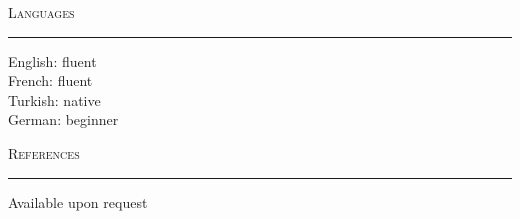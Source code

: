 \documentclass[10pt]{article}
\newcommand{\mysec}[1]{\vspace{2em}\textsc{\large #1}\vspace{1mm}\hrule\vspace{2mm}}
\newcommand{\mysub}[3]{\textbf{#1} {#2} \hfill {\em #3}}
\newcommand{\myssub}[1]{\hspace*{2mm}\parbox{163mm}{#1}\vspace*{2mm}}
\begin{document}

\mysec{Languages}


\myssub{English: fluent \\
French: fluent \\
Turkish: native \\
German: beginner}

\mysec{References}

\myssub{Available upon request\\}
\end{document}
